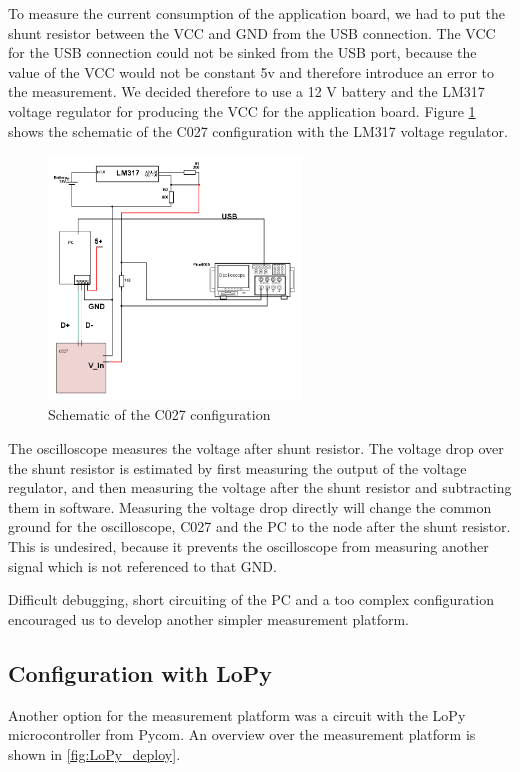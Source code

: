 To measure the current consumption of the application board, we had to put the shunt resistor between the VCC and GND from the USB connection. The VCC for the USB connection could not be sinked from the USB port, because the value of the VCC would not be constant 5v and therefore introduce an error to the measurement. We decided therefore to use a 12 V battery and the LM317 voltage regulator for producing the VCC for the application board. Figure \ref{fig:Schematic_C027} shows the schematic of the C027 configuration with the LM317 voltage regulator. 

\begin{figure}[H]
\centering
\includegraphics[height=6.5cm]{Project_Report/Images/C027_Schematic.png}
\caption{Schematic of the C027 configuration}
\label{fig:Schematic_C027}
\end{figure}

The oscilloscope measures the voltage after shunt resistor. The voltage drop over the shunt resistor is estimated by first measuring the output of the voltage regulator, and then measuring the voltage after the shunt resistor and subtracting them in software. Measuring the voltage drop directly will change the common ground for the oscilloscope, C027 and the PC to the node after the shunt resistor. This is undesired, because it prevents the oscilloscope from measuring another signal which is not referenced to that GND. 

Difficult debugging, short circuiting of the PC and a too complex configuration encouraged us to develop another simpler measurement platform. 



\subsection{Configuration with LoPy}
Another option for the measurement platform was a circuit with the LoPy microcontroller from Pycom. An overview over the measurement platform is shown in \ref{fig:LoPy_deploy}. 

